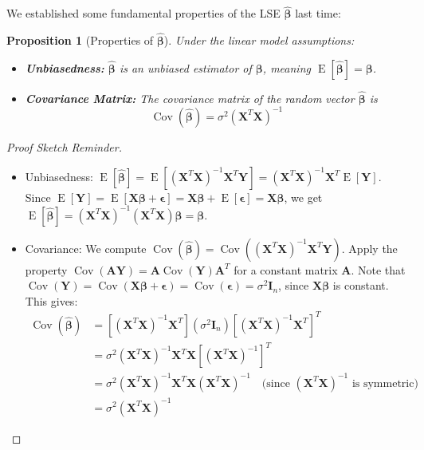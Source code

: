 \documentclass[11pt]{article}
\theoremstyle{mytheoremstyle}
\newtheorem{proposition}[theorem]{Proposition}
\theoremstyle{mydefinitionstyle}
\newcommand{\vect}[1]{\mathbf{#1}}
\DeclareMathOperator{\E}{E}
\DeclareMathOperator{\Cov}{Cov}
\begin{document}
We established some fundamental properties of the LSE $\hat{\vect{\beta}}$ last time:

\begin{proposition}[Properties of $\hat{\vect{\beta}}$]
Under the linear model assumptions:
\begin{itemize}
    \item \textbf{Unbiasedness:} $\hat{\vect{\beta}}$ is an unbiased estimator of $\vect{\beta}$, meaning $\E[\hat{\vect{\beta}}] = \vect{\beta}$.
    \item \textbf{Covariance Matrix:} The covariance matrix of the random vector $\hat{\vect{\beta}}$ is
        \begin{equation*}
        \Cov(\hat{\vect{\beta}}) = \sigma^2 (\vect{X}^T \vect{X})^{-1}
        \end{equation*}
\end{itemize}
\end{proposition}

\begin{proof}[Proof Sketch Reminder]
\begin{itemize}
    \item Unbiasedness: $\E[\hat{\vect{\beta}}] = \E[(\vect{X}^T \vect{X})^{-1} \vect{X}^T \vect{Y}] = (\vect{X}^T \vect{X})^{-1} \vect{X}^T \E[\vect{Y}]$. Since $\E[\vect{Y}] = \E[\vect{X}\vect{\beta} + \vect{\epsilon}] = \vect{X}\vect{\beta} + \E[\vect{\epsilon}] = \vect{X}\vect{\beta}$, we get $\E[\hat{\vect{\beta}}] = (\vect{X}^T \vect{X})^{-1} (\vect{X}^T \vect{X}) \vect{\beta} = \vect{\beta}$.
    \item Covariance: We compute $\Cov(\hat{\vect{\beta}}) = \Cov((\vect{X}^T \vect{X})^{-1} \vect{X}^T \vect{Y})$. Apply the property $\Cov(\vect{A}\vect{Y}) = \vect{A}\Cov(\vect{Y})\vect{A}^T$ for a constant matrix $\vect{A}$. Note that $\Cov(\vect{Y}) = \Cov(\vect{X}\vect{\beta} + \vect{\epsilon}) = \Cov(\vect{\epsilon}) = \sigma^2 \vect{I}_n$, since $\vect{X}\vect{\beta}$ is constant. This gives:
    \begin{align*}
    \Cov(\hat{\vect{\beta}}) &= [(\vect{X}^T \vect{X})^{-1} \vect{X}^T] (\sigma^2 \vect{I}_n) [(\vect{X}^T \vect{X})^{-1} \vect{X}^T]^T \\
    &= \sigma^2 (\vect{X}^T \vect{X})^{-1} \vect{X}^T \vect{X} [(\vect{X}^T \vect{X})^{-1}]^T \\
    &= \sigma^2 (\vect{X}^T \vect{X})^{-1} \vect{X}^T \vect{X} (\vect{X}^T \vect{X})^{-1} \quad \text{(since } (\vect{X}^T \vect{X})^{-1} \text{ is symmetric)} \\
    &= \sigma^2 (\vect{X}^T \vect{X})^{-1}
    \end{align*}
\end{itemize}
\end{proof}
\end{document}

